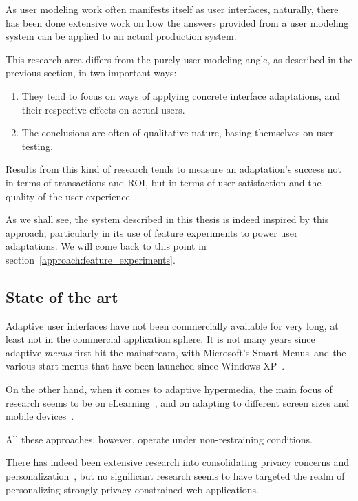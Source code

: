     As user modeling work often manifests itself as user interfaces, naturally, there has been done extensive work on how the answers provided from a user modeling system can be applied to an actual production system.

    This research area differs from the purely user modeling angle, as described in the previous section, in two important ways:

    \begin{enumerate}
      \item They tend to focus on ways of applying concrete interface adaptations, and their respective effects on actual users.
      \item The conclusions are often of qualitative nature, basing themselves on user testing.
    \end{enumerate}

    Results from this kind of research tends to measure an adaptation's success not in terms of transactions and ROI, but in terms of user satisfaction and the quality of the user experience~\cite{Gajos2006,Findlater2008}.

    As we shall see, the system described in this thesis is indeed inspired by this approach, particularly in its use of feature experiments to power user adaptations. We will come back to this point in section~\ref{approach:feature_experiments}.

  \subsection{State of the art}

    Adaptive user interfaces have not been commercially available for very long, at least not in the commercial application sphere. It is not many years since adaptive \emph{menus} first hit the mainstream, with Microsoft's Smart Menus\texttrademark\ and the various start menus that have been launched since Windows XP~\cite{Gajos2006}.

    On the other hand, when it comes to adaptive hypermedia, the main focus of research seems to be on eLearning~\cite{Vrieze}, and on adapting to different screen sizes and mobile devices~\cite{Findlater2008}.

    All these approaches, however, operate under non-restraining conditions.

    There has indeed been extensive research into consolidating privacy concerns and personalization~\cite{Kobsa2007,Wang2010,Wang2012,Knijnenburg2013}, but no significant research seems to have targeted the realm of personalizing strongly privacy-constrained web applications.
